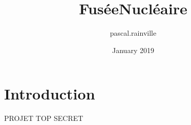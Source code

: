 \documentclass{article}
\title{FuséeNucléaire}
\author{pascal.rainville }
\date{January 2019}
\begin{document}
\maketitle

\section{Introduction}

PROJET TOP SECRET
\end{document}

